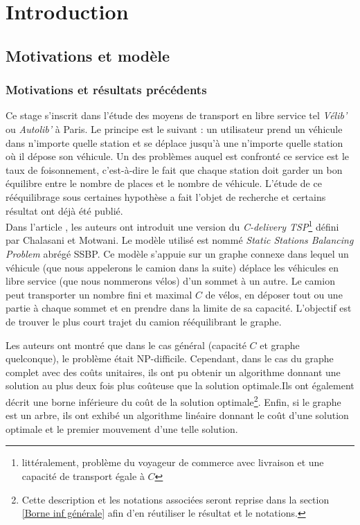 \chapter{Introduction}

\section{Motivations et modèle}

\subsection{Motivations et résultats précédents}
Ce stage s'inscrit dans l'étude des moyens de transport en libre service tel \emph{Vélib'} ou \emph{Autolib'} à Paris. Le principe est le suivant : un utilisateur prend un véhicule dans n'importe quelle station et se déplace jusqu'à une n'importe quelle station où il dépose son véhicule. Un des problèmes auquel est confronté ce service est le taux de foisonnement, c'est-à-dire le fait que chaque station doit garder un bon équilibre entre le nombre de places et le nombre de véhicule. L'étude de ce rééquilibrage sous certaines hypothèse a fait l'objet de recherche et certains résultat ont déjà été publié.
\\

Dans l'article \cite{Benchimol2011}, les auteurs ont introduit une version du \emph{C-delivery TSP}\footnote{littéralement, problème du voyageur de commerce avec livraison et une capacité de transport égale à $C$} défini par Chalasani et Motwani. Le modèle utilisé est nommé \emph{Static Stations Balancing Problem} abrégé SSBP. Ce modèle s'appuie sur un graphe connexe dans lequel un véhicule (que nous appelerons le camion dans la suite) déplace les véhicules en libre service (que nous nommerons vélos) d'un sommet à un autre. Le camion peut transporter un nombre fini et maximal $C$ de vélos, en déposer tout ou une partie à chaque sommet et en prendre dans la limite de sa capacité. L'objectif est de trouver le plus court trajet du camion rééquilibrant le graphe.

Les auteurs ont montré que dans le cas général (capacité $C$ et graphe quelconque), le problème était NP-difficile. Cependant, dans le cas du graphe complet avec des coûts unitaires, ils ont pu obtenir un algorithme donnant une solution au plus deux fois plus coûteuse que la solution optimale.Ils ont également décrit une borne inférieure du coût de la solution optimale\footnote{Cette description et les notations associées seront reprise dans la section \ref{Borne inf générale} afin d'en réutiliser le résultat et le notations.}. Enfin, si le graphe est un arbre, ils ont exhibé un algorithme linéaire donnant le coût d'une solution optimale et le premier mouvement d'une telle solution.
\\

